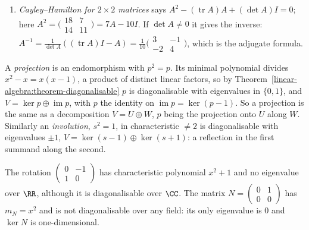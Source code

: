 \begin{example}
\begin{enumerate}
polynomial $x^2 - x - 1$ has the real roots $\varphi = \frac{1 + \sqrt5}2$ and $\psi = \frac{1 - \sqrt5}2$, so $M$ is diagonalisable over $\RR$ and $F_n = a\varphi^n + b\psi^n$ for constants determined by $F_0$
and $F_1$: $a + b = 0$, $a\varphi + b\psi = 1$, so $a = -b = 1/\sqrt5$ and $F_n = (\varphi^n - \psi^n)/\sqrt5$ (Binet's formula). As $|\psi| < 1$, $F_n$ is the integer closest to $\varphi^n/\sqrt5$.
\item \emph{Cayley--Hamilton for $2 \times 2$ matrices} says $A^2 - (\operatorname{tr}A)A + (\det A)I = 0$; here $A^2 = \bigl(\begin{smallmatrix}18 & 7\\ 14 & 11\end{smallmatrix}\bigr) = 7A - 10I$. If $\det A \neq 0$
it gives the inverse: $A^{-1} = \frac{1}{\det A}((\operatorname{tr}A)I - A) = \frac1{10}\bigl(\begin{smallmatrix}3 & -1\\ -2 & 4\end{smallmatrix}\bigr)$, which is the adjugate formula.
\end{enumerate}
\end{example}

\begin{example}\label{linear-algebra:example-projections}
A \emph{projection} is an endomorphism with $p^2 = p$. Its minimal polynomial divides $x^2 - x = x(x - 1)$, a product of distinct linear factors, so by
Theorem~\ref{linear-algebra:theorem-diagonalisable} $p$ is diagonalisable with eigenvalues in $\{0, 1\}$, and $V = \ker p \oplus \operatorname{im}p$, with $p$ the identity on $\operatorname{im}p = \ker(p - 1)$.
So a projection is the same as a decomposition $V = U \oplus W$, $p$ being the projection onto $U$ along $W$. Similarly an \emph{involution}, $s^2 = 1$, in characteristic $\neq 2$ is diagonalisable with
eigenvalues $\pm1$, $V = \ker(s - 1) \oplus \ker(s + 1)$: a reflection in the first summand along the second.
\end{example}

\begin{counterexample}\label{linear-algebra:counterexample-not-diagonalisable}
The rotation $\begin{pmatrix} 0 & -1 \\ 1 & 0 \end{pmatrix}$ has characteristic polynomial $x^2 + 1$ and no eigenvalue
over $\RR$, although it is diagonalisable over $\CC$. The matrix
$N = \begin{pmatrix} 0 & 1 \\ 0 & 0 \end{pmatrix}$ has $m_N = x^2$ and is not diagonalisable over any field: its only
eigenvalue is $0$ and $\ker N$ is one-dimensional.
\end{counterexample}

